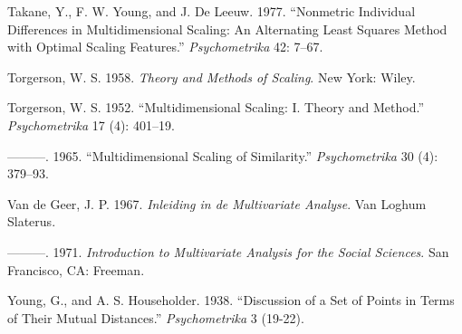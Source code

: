 \documentclass[
  12pt,
  letterpaper,
  DIV=11,
  numbers=noendperiod]{scrartcl}
\newlength{\cslhangindent}
\newenvironment{CSLReferences}[2] %
 {\begin{list}{}{%
  \setlength{\itemindent}{0pt}
  \setlength{\leftmargin}{0pt}
  \setlength{\parsep}{0pt}
  \ifodd #1
   \setlength{\leftmargin}{\cslhangindent}
   \setlength{\itemindent}{-1\cslhangindent}
  \fi
  \setlength{\itemsep}{#2\baselineskip}}}
 {\end{list}}
\begin{document}
\begin{CSLReferences}{1}{0}
Takane, Y., F. W. Young, and J. De Leeuw. 1977. {``Nonmetric Individual
Differences in Multidimensional Scaling: An Alternating Least Squares
Method with Optimal Scaling Features.''} \emph{Psychometrika} 42: 7--67.

Torgerson, W. S. 1958. \emph{{Theory and Methods of Scaling}}. New York:
Wiley.

Torgerson, W. S. 1952. {``{Multidimensional Scaling: I. Theory and
Method}.''} \emph{Psychometrika} 17 (4): 401--19.

---------. 1965. {``{Multidimensional Scaling of Similarity}.''}
\emph{Psychometrika} 30 (4): 379--93.

Van de Geer, J. P. 1967. \emph{{Inleiding in de Multivariate Analyse}}.
Van Loghum Slaterus.

---------. 1971. \emph{{Introduction to Multivariate Analysis for the
Social Sciences}}. San Francisco, CA: Freeman.

Young, G., and A. S. Householder. 1938. {``{Discussion of a Set of
Points in Terms of Their Mutual Distances}.''} \emph{Psychometrika} 3
(19-22).

\end{CSLReferences}
\end{document}
